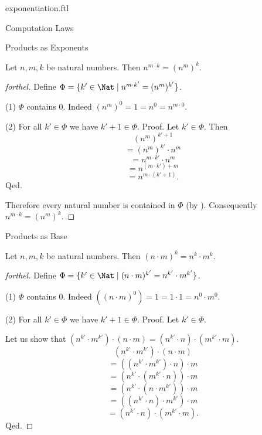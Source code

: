 \documentclass{naproche-library}
\begin{document}
\begin{smodule}[title=Exponentiation]{exponentiation.ftl}
\begin{sfragment}{Computation Laws}
  \begin{sfragment}{Products as Exponents}
    \begin{proposition}[forthel,id=ARITHMETIC_09_7827956571308032]
      Let $n, m, k$ be natural numbers.
      Then $n^{m \cdot k} = (n^{m})^{k}$.
    \end{proposition}
    \begin{proof}[forthel]
      Define $\Phi = \{ k' \in \Nat \mid n^{m \cdot k'} = (n^{m})^{k'} \}$.

      (1) $\Phi$ contains $0$.
      Indeed $(n^{m})^{0}
        = 1
        = n^{0}
        = n^{m \cdot 0}$.

      (2) For all $k' \in \Phi$ we have $k' + 1 \in \Phi$. \newline
      Proof.
        Let $k' \in \Phi$.
        Then
        \[  (n^{m})^{k' + 1}                \]
        \[    = (n^{m})^{k'} \cdot n^{m}    \]
        \[    = n^{m \cdot k'} \cdot n^{m}  \]
        \[    = n^{(m \cdot k') + m}        \]
        \[    = n^{m \cdot (k' + 1)}.       \]
      Qed.

      Therefore every natural number is contained in $\Phi$ (by ).
      Consequently $n^{m \cdot k} = (n^{m})^{k}$.
    \end{proof}
  \end{sfragment}

  \begin{sfragment}{Products as Base}
    \begin{proposition}[forthel,id=ARITHMETIC_09_2563032276271104]
      Let $n, m, k$ be natural numbers.
      Then $(n \cdot m)^{k} = n^{k} \cdot m^{k}$.
    \end{proposition}
    \begin{proof}[forthel]
      Define $\Phi = \{ k' \in \Nat \mid (n \cdot m)^{k'} = n^{k'} \cdot m^{k'} \}$.

      (1) $\Phi$ contains $0$.
      Indeed $((n \cdot m)^{0})
        = 1
        = 1 \cdot 1
        = n^{0} \cdot m^{0}$. %

      (2) For all $k' \in \Phi$ we have $k' + 1 \in \Phi$. \newline
      Proof.
        Let $k' \in \Phi$.

        Let us show that $(n^{k'} \cdot m^{k'}) \cdot (n \cdot m) = (n^{k'} \cdot n) \cdot (m^{k'} \cdot m)$.
          \[  (n^{k'} \cdot m^{k'}) \cdot (n \cdot m)       \]
          \[    = ((n^{k'} \cdot m^{k'}) \cdot n) \cdot m   \]
          \[    = (n^{k'} \cdot (m^{k'} \cdot n)) \cdot m   \]
          \[    = (n^{k'} \cdot (n \cdot m^{k'})) \cdot m   \]
          \[    = ((n^{k'} \cdot n) \cdot m^{k'}) \cdot m   \]
          \[    = (n^{k'} \cdot n) \cdot (m^{k'} \cdot m).  \]
        Qed.


\end{proof}
\end{sfragment}
\end{sfragment}
\end{smodule}
\end{document}
